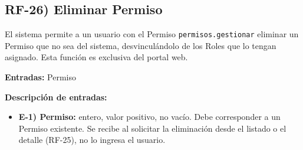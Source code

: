 \subsection*{RF-26) Eliminar Permiso}
El sistema permite a un usuario con el Permiso \texttt{permisos.gestionar} eliminar un Permiso que no sea del sistema, desvincul\'andolo de los Roles que lo tengan asignado. Esta funci\'on es exclusiva del portal web.

\textbf{Entradas:} Permiso

\textbf{Descripci\'on de entradas:}
\begin{itemize}[label={}, leftmargin=1.5em]
  \item \textbf{E-1) Permiso:} entero, valor positivo, no vac\'io. Debe corresponder a un Permiso existente. Se recibe al solicitar la eliminaci\'on desde el listado o el detalle (RF-25), no lo ingresa el usuario.
\end{itemize}

